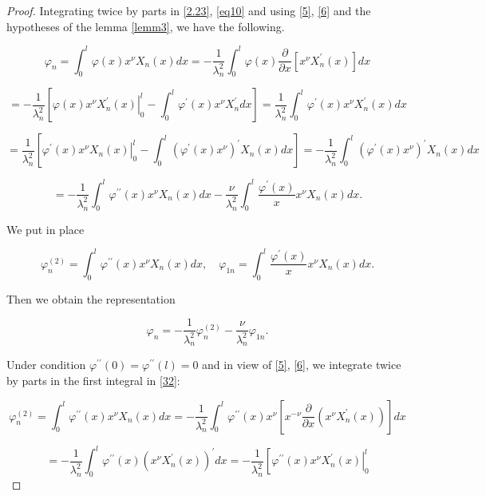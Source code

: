\documentclass[reqno]{amsart}
\theoremstyle{definition}
\numberwithin{equation}{section}
\begin{document}
 \begin{proof}
Integrating twice by parts in \eqref{2.23}, \eqref{eq10} and using \eqref{5}, \eqref{6} and the hypotheses of the lemma \ref{lemm3}, we have the following. 


$$\varphi_n  =\int_0^l \varphi(x) x^\nu X_n(x) d x=-\frac{1}{\lambda_n^2} \int_0^l \varphi(x)\frac{\partial}{\partial x}\left[x^{\nu}X_n^{\prime}(x)\right] d x $$

$$ =-\frac{1}{\lambda_n^2}\left[\left.\varphi(x) x^\nu X_n^{\prime}(x)\right|_0 ^l-\int_0^l \varphi^{\prime}(x) x^\nu X_n^{\prime} d x\right]=\frac{1}{\lambda_n^2} \int_0^l \varphi^{\prime}(x) x^\nu X_n^{\prime}(x) d x$$

$$  =\frac{1}{\lambda_n^2}\left[\left.\varphi^{\prime}(x) x^\nu X_n(x)\right|_0 ^l-\int_0^l\left(\varphi^{\prime}(x) x^\nu\right)^{\prime} X_n(x) d x\right]=-\frac{1}{\lambda_n^2} \int_0^l\left(\varphi^{\prime}(x) x^\nu\right)^{\prime} X_n(x) d x  $$

$$ =-\frac{1}{\lambda_n^2} \int_0^l \varphi^{\prime \prime}(x) x^\nu X_n(x) d x-\frac{\nu}{\lambda_n^2} \int_0^l \frac{\varphi^{\prime}(x)}{x} x^\nu X_n(x) d x.$$

We put in place


\begin{equation}\label{32}
    \varphi_n^{(2)}=\int_0^l \varphi^{\prime \prime}(x) x^\nu X_n(x) d x, \quad \varphi_{1 n}=\int_0^l \frac{\varphi^{\prime}(x)}{x} x^\nu X_n(x) d x.
\end{equation}

Then we obtain the representation

\begin{equation}\label{33}
    \varphi_n=-\frac{1}{\lambda_n^2} \varphi_n^{(2)}-\frac{\nu}{\lambda_n^2} \varphi_{1 n}.
\end{equation}



Under condition $\varphi^{\prime \prime}(0)=\varphi^{\prime \prime}(l)=0$ and in view of \eqref{5}, \eqref{6}, we integrate twice by parts in the first integral in \eqref{32}:


$$ \varphi_n^{(2)}=  \int_0^l \varphi^{\prime \prime}(x) x^\nu X_n(x) d x=-\frac{1}{\lambda_n^2} \int_0^l \varphi^{\prime \prime}(x) x^\nu\left[x^{-\nu}\frac{\partial}{\partial x}\left( x^{\nu}X_n^{\prime}(x)\right)\right] d x $$

$$=  -\frac{1}{\lambda_n^2} \int_0^l \varphi^{\prime \prime}(x)\left(x^\nu X_n^{\prime}(x)\right)^{\prime} d x=-\frac{1}{\lambda_n^2}\left[\left.\varphi^{\prime \prime}(x) x^\nu X_n^{\prime}(x)\right|_0 ^l\right. $$


\end{proof}
\end{document}
